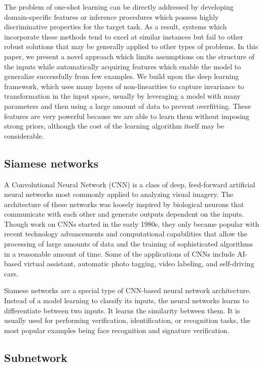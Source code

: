 \documentclass{article}
\begin{document}
The problem of one-shot learning can be directly addressed by developing domain-specific features
or inference procedures which possess highly discriminative properties for the target task. As a result,
systems which incorporate these methods tend to excel at similar instances but fail to other robust
solutions that may be generally applied to other types of problems. In this paper, we present a novel
approach which limits assumptions on the structure of the inputs while automatically acquiring features
which enable the model to generalize successfully from few examples. We build upon the deep learning
framework, which uses many layers of non-linearities to capture invariance to transformation in the
input space, usually by leveraging a model with many parameters and then using a large amount of data
to prevent overfitting. These features are very powerful because we are able to learn them without
imposing strong priors, although the cost of the learning algorithm itself may be considerable.

\subsection{Siamese networks}

A Convolutional Neural Network (CNN) is a class of deep, feed-forward artificial neural networks most commonly applied to analyzing visual imagery. The architecture of these networks was loosely inspired by biological neurons that communicate with each other and generate outputs dependent on the inputs. Though work on CNNs started in the early 1980s, they only became popular with recent technology advancements and computational capabilities that allow the processing of large amounts of data and the training of sophisticated algorithms in a reasonable amount of time. Some of the applications of CNNs include AI-based virtual assistant, automatic photo tagging, video labeling, and self-driving cars.

Siamese networks are a special type of CNN-based neural network architecture. Instead of a model learning to classify its inputs, the neural networks learns to differentiate between two inputs. It learns the similarity between them. It is usually used for performing verification, identification, or recognition tasks, the most popular examples being face recognition and signature verification.

\subsection{Subnetwork}
\end{document}
